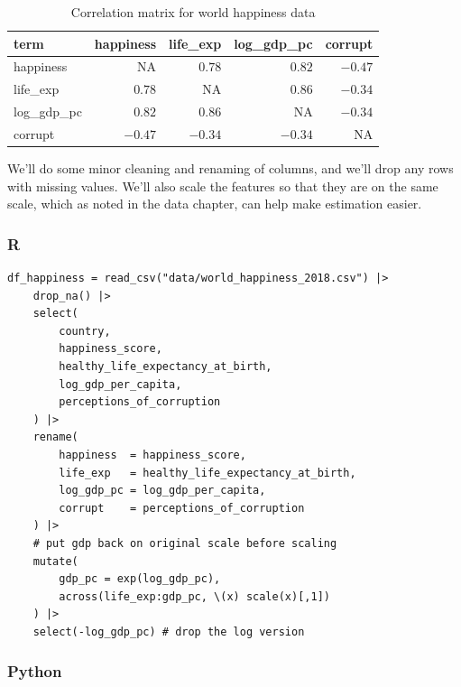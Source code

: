 \documentclass[
  letterpaper,
]{krantz}
\begin{document}
\begin{longtable}{lrrrr}
\caption{Correlation matrix for world happiness data}\tabularnewline

\toprule
term & happiness & life\_exp & log\_gdp\_pc & corrupt \\ 
\midrule\addlinespace[2.5pt]
happiness & \textcolor[HTML]{404040}{NA} & \textcolor[HTML]{404040}{$0.78$} & \textcolor[HTML]{404040}{$0.82$} & \textcolor[HTML]{404040}{$-0.47$} \\ 
life\_exp & \textcolor[HTML]{404040}{$0.78$} & \textcolor[HTML]{404040}{NA} & \textcolor[HTML]{404040}{$0.86$} & \textcolor[HTML]{404040}{$-0.34$} \\ 
log\_gdp\_pc & \textcolor[HTML]{404040}{$0.82$} & \textcolor[HTML]{404040}{$0.86$} & \textcolor[HTML]{404040}{NA} & \textcolor[HTML]{404040}{$-0.34$} \\ 
corrupt & \textcolor[HTML]{404040}{$-0.47$} & \textcolor[HTML]{404040}{$-0.34$} & \textcolor[HTML]{404040}{$-0.34$} & \textcolor[HTML]{404040}{NA} \\ 
\bottomrule
\end{longtable}

\normalsize

We'll do some minor cleaning and renaming of columns, and we'll drop any
rows with missing values. We'll also scale the features so that they are
on the same scale, which as noted in the data chapter, can help make
estimation easier.

\subsubsection{R}

\begin{verbatim}
df_happiness = read_csv("data/world_happiness_2018.csv") |>
    drop_na() |>
    select(
        country,
        happiness_score,
        healthy_life_expectancy_at_birth,
        log_gdp_per_capita,
        perceptions_of_corruption
    ) |>
    rename(
        happiness  = happiness_score,
        life_exp   = healthy_life_expectancy_at_birth,
        log_gdp_pc = log_gdp_per_capita,
        corrupt    = perceptions_of_corruption
    ) |>
    # put gdp back on original scale before scaling
    mutate(
        gdp_pc = exp(log_gdp_pc), 
        across(life_exp:gdp_pc, \(x) scale(x)[,1])
    ) |>
    select(-log_gdp_pc) # drop the log version
\end{verbatim}

\subsubsection{Python}
\end{document}
